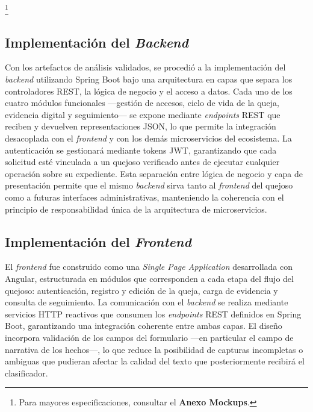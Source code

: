 \footnote{Para mayores especificaciones, consultar el \textbf{Anexo Mockups}.}

\clearpage
\subsection{Implementación del \textit{Backend}}
\label{subsec:backend}

Con los artefactos de análisis validados, se procedió a la implementación del 
\textit{backend} utilizando Spring Boot bajo una arquitectura en capas que separa 
los controladores REST, la lógica de negocio y el acceso a datos. Cada uno de 
los cuatro módulos funcionales —gestión de accesos, ciclo de vida de la queja, 
evidencia digital y seguimiento— se expone mediante \textit{endpoints} REST que 
reciben y devuelven representaciones JSON, lo que permite la integración 
desacoplada con el \textit{frontend} y con los demás microservicios del 
ecosistema. La autenticación se gestionará mediante tokens JWT, garantizando que 
cada solicitud esté vinculada a un quejoso verificado antes de ejecutar cualquier 
operación sobre su expediente. Esta separación entre lógica de negocio y capa de 
presentación permite que el mismo \textit{backend} sirva tanto al \textit{frontend} 
del quejoso como a futuras interfaces administrativas, manteniendo la coherencia 
con el principio de responsabilidad única de la arquitectura de microservicios.



\subsection{Implementación del \textit{Frontend}}
\label{subsec:frontend}

El \textit{frontend} fue construido como una \textit{Single Page Application} 
desarrollada con Angular, estructurada en módulos que corresponden a cada etapa 
del flujo del quejoso: autenticación, registro y edición de la queja, carga de 
evidencia y consulta de seguimiento. La comunicación con el \textit{backend} se 
realiza mediante servicios HTTP reactivos que consumen los \textit{endpoints} 
REST definidos en Spring Boot, garantizando una integración coherente entre ambas 
capas. El diseño incorpora validación de los campos del formulario 
—en particular el campo de narrativa de los hechos—, lo que reduce la posibilidad 
de capturas incompletas o ambiguas que pudieran afectar la calidad del texto que 
posteriormente recibirá el clasificador.

